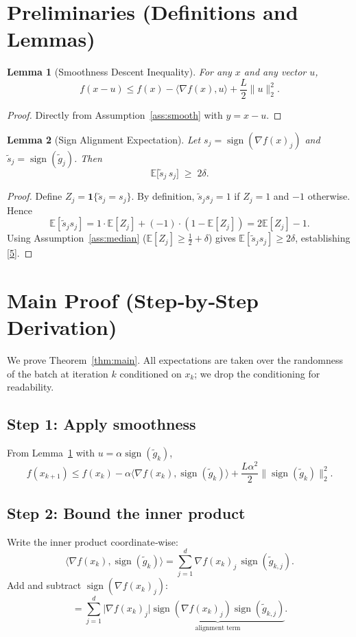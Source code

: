 \documentclass{article}
\newtheorem{lemma}{Lemma}
\newcommand{\sign}{\operatorname{sign}}
\newcommand{\E}{\mathbb{E}}
\begin{document}
\newpage
\section*{Preliminaries (Definitions and Lemmas)}
\begin{lemma}[Smoothness Descent Inequality]\label{lem:smooth}
For any $x$ and any vector $u$,
\[
f(x-u)\le f(x)-\langle\nabla f(x),u\rangle+\frac{L}{2}\|u\|_{2}^{2}.
\]
\end{lemma}
\begin{proof}
Directly from Assumption~\ref{ass:smooth} with $y=x-u$.
\end{proof}

\begin{lemma}[Sign Alignment Expectation]\label{lem:sign}
Let $s_{j}=\sign(\nabla f(x)_{j})$ and $\tilde s_{j}=\sign(\tilde g_{j})$. Then
\[
\E\bigl[\tilde s_{j}\,s_{j}\bigr]\;\ge\;2\delta.
\tag{5}
\]
\end{lemma}
\begin{proof}
Define $Z_{j}=\mathbf{1}\{\tilde s_{j}=s_{j}\}$. By definition,
$\tilde s_{j}s_{j}=1$ if $Z_{j}=1$ and $-1$ otherwise. Hence
\[
\E[\tilde s_{j}s_{j}]
=1\cdot\E[Z_{j}]+(-1)\cdot(1-\E[Z_{j}])
=2\E[Z_{j}]-1.
\]
Using Assumption~\ref{ass:median} ($\E[Z_{j}]\ge\tfrac12+\delta$) gives
$\E[\tilde s_{j}s_{j}]\ge2\delta$, establishing \eqref{5}.
\end{proof}

\section*{Main Proof (Step‑by‑Step Derivation)}
We prove Theorem~\ref{thm:main}. All expectations are taken over the randomness of the batch at iteration $k$ conditioned on $x_{k}$; we drop the conditioning for readability.

\subsection*{Step 1: Apply smoothness}
From Lemma~\ref{lem:smooth} with $u=\alpha\sign(\tilde g_{k})$,
\[
f(x_{k+1})\le f(x_{k})-\alpha\langle\nabla f(x_{k}),\sign(\tilde g_{k})\rangle
+\frac{L\alpha^{2}}{2}\|\sign(\tilde g_{k})\|_{2}^{2}.
\tag{6}
\]

\subsection*{Step 2: Bound the inner product}
Write the inner product coordinate‑wise:
\[
\langle\nabla f(x_{k}),\sign(\tilde g_{k})\rangle
=\sum_{j=1}^{d}\nabla f(x_{k})_{j}\,\sign(\tilde g_{k,j}).
\]
Add and subtract $\sign(\nabla f(x_{k})_{j})$:
\[
= \sum_{j=1}^{d}\bigl|\nabla f(x_{k})_{j}\bigr|
      \underbrace{\sign(\nabla f(x_{k})_{j})\sign(\tilde g_{k,j})}_{\text{alignment term}}.
\tag{7}
\]
\end{document}
